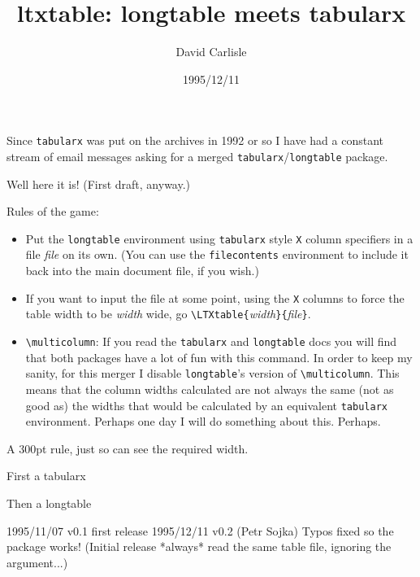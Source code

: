 \tracingtabularx


\title{ltxtable: longtable meets tabularx}
\author{David Carlisle}
\date{1995/12/11}
\maketitle

Since \texttt{tabularx} was put on the archives in 1992 or so I have
had a constant stream of email messages asking for a merged
\texttt{tabularx}/\texttt{longtable} package.

Well here it is!  (First draft, anyway.)

Rules of the game:

\begin{itemize}
\item Put the \texttt{longtable} environment using \texttt{tabularx}
  style \texttt{X} column specifiers in a file \emph{file} on its
  own. (You can use the \texttt{filecontents} environment to include
  it back into the main document file, if you wish.)
\item If you want to input the file at some point, using the
  \texttt{X} columns to force the table width to be \emph{width} wide,
  go \verb|\LTXtable{|\emph{width}\verb|}{|\emph{file}\verb|}|.
\item \verb|\multicolumn|: If you read the \texttt{tabularx} and
  \texttt{longtable} docs you will find that both packages have a lot
  of fun with this command. In order to keep my sanity, for this
  merger I disable \texttt{longtable}'s version of \verb|\multicolumn|.
  This means that the column widths calculated are not always the same
  (not as good as) the widths that would be calculated by an
  equivalent \texttt{tabularx} environment. Perhaps one day I will do
  something about this. Perhaps.
\end{itemize}

\clearpage

\centering


A 300pt rule, just so can see the required width.

\mbox{\vrule width 300pt height 1pt}

First a tabularx


\begingroup
\renewenvironment{longtable}{\noindent\tabularx{300pt}}{\endtabularx}
\def\endhead{\\}\def\endfoot{\rlap{ !!!}\\}

\endgroup


Then a longtable






1995/11/07 v0.1  first release
1995/12/11 v0.2  (Petr Sojka) Typos fixed so the package works!
                 (Initial release *always* read the same table file,
                  ignoring the argument...)
